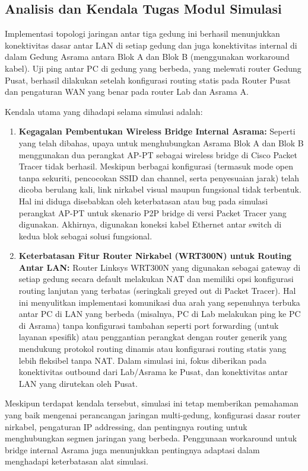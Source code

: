 \subsection{Analisis dan Kendala Tugas Modul Simulasi}
Implementasi topologi jaringan antar tiga gedung ini berhasil menunjukkan konektivitas dasar antar LAN di setiap gedung dan juga konektivitas internal di dalam Gedung Asrama antara Blok A dan Blok B (menggunakan workaround kabel). Uji ping antar PC di gedung yang berbeda, yang melewati router Gedung Pusat, berhasil dilakukan setelah konfigurasi routing statis pada Router Pusat dan pengaturan WAN yang benar pada router Lab dan Asrama A.

Kendala utama yang dihadapi selama simulasi adalah:
\begin{enumerate}
    \item \textbf{Kegagalan Pembentukan Wireless Bridge Internal Asrama:} Seperti yang telah dibahas, upaya untuk menghubungkan Asrama Blok A dan Blok B menggunakan dua perangkat AP-PT sebagai wireless bridge di Cisco Packet Tracer tidak berhasil. Meskipun berbagai konfigurasi (termasuk mode open tanpa sekuriti, pencocokan SSID dan channel, serta penyesuaian jarak) telah dicoba berulang kali, link nirkabel visual maupun fungsional tidak terbentuk. Hal ini diduga disebabkan oleh keterbatasan atau bug pada simulasi perangkat AP-PT untuk skenario P2P bridge di versi Packet Tracer yang digunakan. Akhirnya, digunakan koneksi kabel Ethernet antar switch di kedua blok sebagai solusi fungsional.
    \item \textbf{Keterbatasan Fitur Router Nirkabel (WRT300N) untuk Routing Antar LAN:} Router Linksys WRT300N yang digunakan sebagai gateway di setiap gedung secara default melakukan NAT dan memiliki opsi konfigurasi routing lanjutan yang terbatas (seringkali greyed out di Packet Tracer). Hal ini menyulitkan implementasi komunikasi dua arah yang sepenuhnya terbuka antar PC di LAN yang berbeda (misalnya, PC di Lab melakukan ping ke PC di Asrama) tanpa konfigurasi tambahan seperti port forwarding (untuk layanan spesifik) atau penggantian perangkat dengan router generik yang mendukung protokol routing dinamis atau konfigurasi routing statis yang lebih fleksibel tanpa NAT. Dalam simulasi ini, fokus diberikan pada konektivitas outbound dari Lab/Asrama ke Pusat, dan konektivitas antar LAN yang dirutekan oleh Pusat.
\end{enumerate}

Meskipun terdapat kendala tersebut, simulasi ini tetap memberikan pemahaman yang baik mengenai perancangan jaringan multi-gedung, konfigurasi dasar router nirkabel, pengaturan IP addressing, dan pentingnya routing untuk menghubungkan segmen jaringan yang berbeda. Penggunaan workaround untuk bridge internal Asrama juga menunjukkan pentingnya adaptasi dalam menghadapi keterbatasan alat simulasi.


